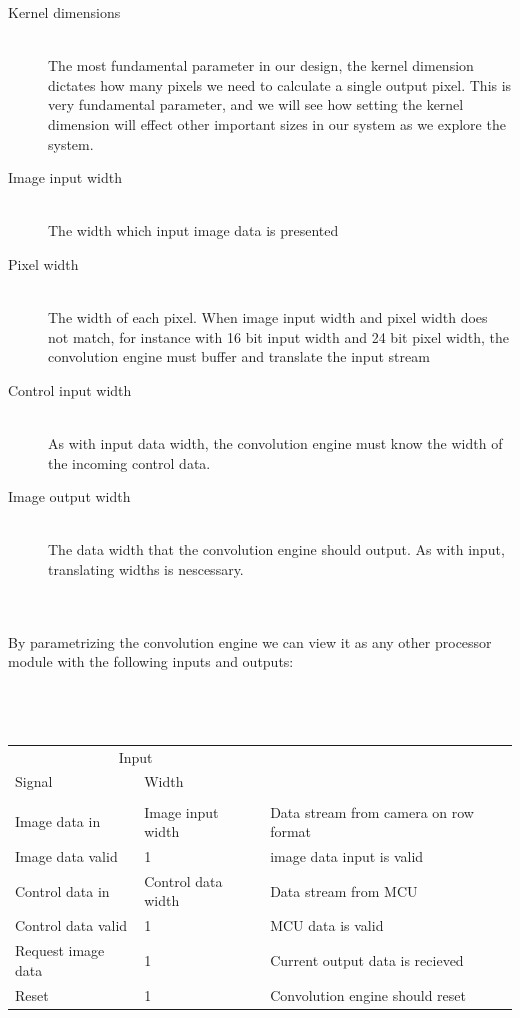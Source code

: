 \begin{description}
    \item[Kernel dimensions] \hfill \\
        The most fundamental parameter in our design, the kernel dimension dictates how many pixels we need to calculate a single output pixel.
        This is very fundamental parameter, and we will see how setting the kernel dimension will effect other important sizes in our system as we explore the system.
    \item[Image input width] \hfill \\
        The width which input image data is presented 
    \item[Pixel width] \hfill \\
        The width of each pixel. When image input width and pixel width does not match, for instance with 16 bit input width and 24 bit pixel width, the convolution engine must buffer and translate the input stream 
    \item[Control input width] \hfill \\
        As with input data width, the convolution engine must know the width of the incoming control data.
    \item[Image output width] \hfill \\
        The data width that the convolution engine should output. As with input, translating widths is nescessary.
\end{description}
\\ \\
By parametrizing the convolution engine we can view it as any other processor module with the following inputs and outputs:
\\ \\ \\ \\
\begin{tabular}{ l | l | l }
\multicolumn{2}{c}{Input}
    \hline \\
    Signal & Width\\
    \hline \\
    Image data in           & Image input width     & Data stream from camera on row format \\
    Image data valid        & 1                     & image data input is valid\\
    Control data in         & Control data width    & Data stream from MCU\\
    Control data valid      & 1                     & MCU data is valid\\
    Request image data      & 1                     & Current output data is recieved\\
    Reset                   & 1                     & Convolution engine should reset
\end{tabular}
